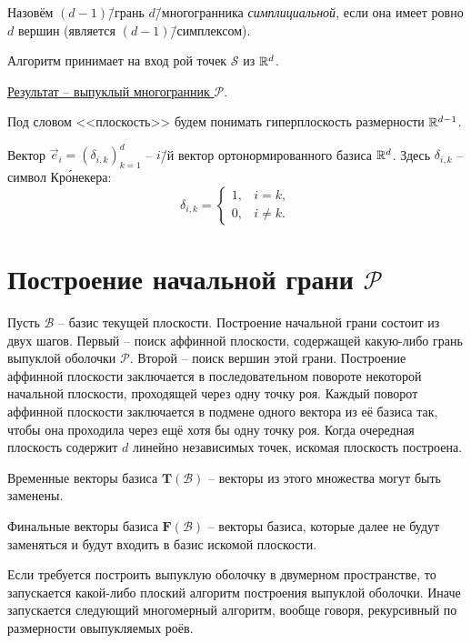 \documentclass[a4paper,12pt]{article}
\newcommand{\R}[1][]{%
  \ifthenelse{\equal{#1}{}}%
  {\mathbb{R}}%
  {\mathbb{R}^{#1}}}
\newcommand{\Swarm}{\mathcal{S}} %
\newcommand{\Polyhedron}{\mathcal{P}} %
\newcommand{\Basis}{\mathcal{B}} %
\newcommand{\TempVec}{\mathbf{T}(\Basis)} %
\newcommand{\FinalVec}{\mathbf{F}(\Basis)} %
\begin{document}
  Назовём $(d-1)$\=/грань $d$\=/многогранника \textit{симплициальной}, если она имеет ровно $d$ вершин (является $(d-1)$\=/симплексом).

  Алгоритм принимает на вход рой точек $\Swarm$ из $\R[d]$.

  \underline{Результат -- выпуклый многогранник $\Polyhedron$}.

  Под словом <<плоскость>> будем понимать гиперплоскость размерности $\R[d-1]$.

  Вектор $\vec e_i = (\delta_{i,k})_{k=1}^d$ -- $i$\=/й вектор ортонормированного базиса $\R[d]$.
  Здесь $\delta_{i,k}$ -- символ Кр\'{о}некера:
  $$
  \delta_{i,k} =
  \begin{cases}
    1, & i=k, \\
    0, & i\neq k.
  \end{cases}
  $$


\section{Построение начальной грани $\Polyhedron$}
  Пусть $\Basis$ -- базис текущей плоскости. Построение начальной грани состоит из двух шагов. Первый -- поиск аффинной плоскости, содержащей какую-либо грань выпуклой оболочки $\Polyhedron$. Второй -- поиск вершин этой грани. Построение аффинной плоскости заключается в последовательном повороте некоторой начальной плоскости, проходящей через одну точку роя. Каждый поворот аффинной плоскости заключается в подмене одного вектора из её базиса так, чтобы она проходила через ещё хотя бы одну точку роя. Когда очередная плоскость содержит $d$ линейно независимых точек, искомая плоскость построена.

  Временные векторы базиса $\TempVec$ -- векторы из этого множества могут быть заменены.

  Финальные векторы базиса $\FinalVec$ -- векторы базиса, которые далее не будут заменяться и будут входить в базис искомой плоскости.

  Если требуется построить выпуклую оболочку в двумерном пространстве, то запускается какой-либо плоский алгоритм построения выпуклой оболочки. Иначе запускается следующий многомерный алгоритм, вообще говоря, рекурсивный по размерности овыпукляемых роёв.
\end{document}

